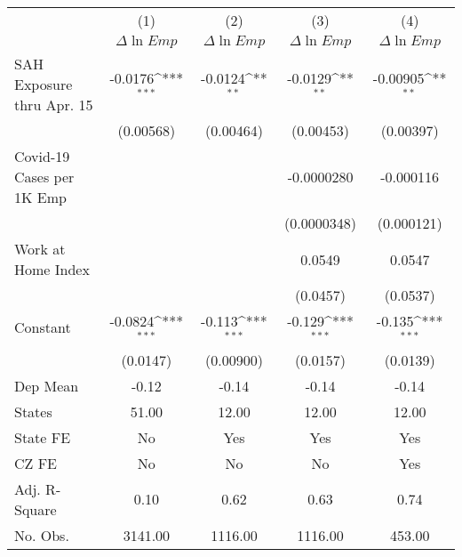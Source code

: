 {
\def\sym#1{\ifmmode^{#1}\else\(^{#1}\)\fi}
\begin{tabular}{l*{4}{c}}
\hline\hline
            &\multicolumn{1}{c}{(1)}         &\multicolumn{1}{c}{(2)}         &\multicolumn{1}{c}{(3)}         &\multicolumn{1}{c}{(4)}         \\
            &$\Delta \ln Emp$         &$\Delta \ln Emp$         &$\Delta \ln Emp$         &$\Delta \ln Emp$         \\
\hline
SAH Exposure thru Apr. 15&     -0.0176\sym{***}&     -0.0124\sym{**} &     -0.0129\sym{**} &    -0.00905\sym{**} \\
            &   (0.00568)         &   (0.00464)         &   (0.00453)         &   (0.00397)         \\
Covid-19 Cases per 1K Emp&                     &                     &  -0.0000280         &   -0.000116         \\
            &                     &                     & (0.0000348)         &  (0.000121)         \\
Work at Home Index&                     &                     &      0.0549         &      0.0547         \\
            &                     &                     &    (0.0457)         &    (0.0537)         \\
Constant    &     -0.0824\sym{***}&      -0.113\sym{***}&      -0.129\sym{***}&      -0.135\sym{***}\\
            &    (0.0147)         &   (0.00900)         &    (0.0157)         &    (0.0139)         \\
\hline
Dep Mean    &       -0.12         &       -0.14         &       -0.14         &       -0.14         \\
States      &       51.00         &       12.00         &       12.00         &       12.00         \\
State FE    &          No         &         Yes         &         Yes         &         Yes         \\
CZ FE       &          No         &          No         &          No         &         Yes         \\
Adj. R-Square&        0.10         &        0.62         &        0.63         &        0.74         \\
No. Obs.    &     3141.00         &     1116.00         &     1116.00         &      453.00         \\
\hline\hline
\end{tabular}
}

